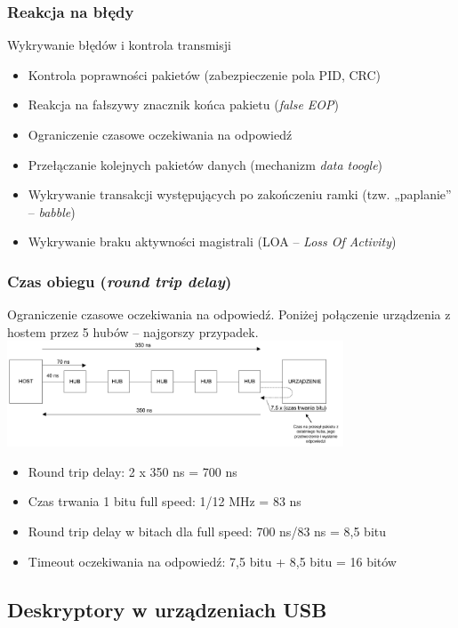 \documentclass[a4paper,twoside]{article}
\begin{document}
	\subsubsection{Reakcja na błędy}
	Wykrywanie błędów i kontrola transmisji\\
	\begin{itemize}
		\item Kontrola poprawności pakietów (zabezpieczenie pola PID, CRC)
		\item Reakcja na fałszywy znacznik końca pakietu (\emph{false EOP})
		\item Ograniczenie czasowe oczekiwania na odpowiedź
		\item Przełączanie kolejnych pakietów danych (mechanizm \emph{data toogle})
		\item Wykrywanie transakcji występujących po zakończeniu ramki (tzw. „paplanie” – \emph{babble})
		\item Wykrywanie braku aktywności magistrali (LOA – \emph{Loss Of Activity})
	\end{itemize}
	\subsubsection{Czas obiegu (\emph{round trip delay})}
	Ograniczenie czasowe oczekiwania na odpowiedź. Poniżej połączenie urządzenia z hostem przez 5 hubów – najgorszy przypadek.\\
	\includegraphics[width=10cm]{./wyklady/USB_23_1.pdf}
	\begin{itemize}
		\item Round trip delay: 2 x 350 ns = 700 ns
		\item Czas trwania 1 bitu full speed: 1/12 MHz = 83 ns
		\item Round trip delay w bitach dla full speed: 700 ns/83 ns = 8,5 bitu
		\item Timeout oczekiwania na odpowiedź: 7,5 bitu + 8,5 bitu = 16 bitów
	\end{itemize}
	
\subsection{Deskryptory w urządzeniach USB}
\end{document}
